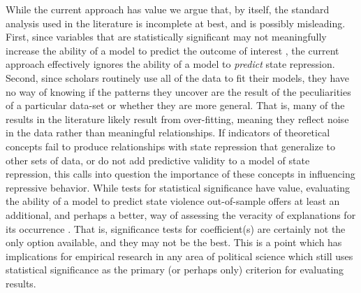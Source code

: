 \documentclass[12pt]{article}
\begin{document}
While the current approach has value we argue that, by itself, the standard analysis used in the literature is incomplete at best, and is possibly misleading. First, since variables that are statistically significant may not meaningfully increase the ability of a model to predict the outcome of interest \citep{Wardetal2010}, the current approach effectively ignores the ability of a model to {\em predict} state repression. Second, since scholars routinely use all of the data to fit their models, they have no way of knowing if the patterns they uncover are the result of the peculiarities of a particular data-set or whether they are more general. That is, many of the results in the literature likely result from over-fitting, meaning they reflect noise in the data rather than meaningful relationships. If indicators of theoretical concepts fail to produce relationships with state repression that generalize to other sets of data, or do not add predictive validity to a model of state repression, this calls into question the importance of these concepts in influencing repressive behavior. While tests for statistical significance have value, evaluating the ability of a model to predict state violence out-of-sample offers at least an additional, and perhaps a better, way of assessing the veracity of explanations for its occurrence \citep[See, e.g.][]{BeckKingZeng2000}. That is, significance tests for coefficient(s) are certainly not the only option available, and they may not be the best. This is a point which has implications for empirical research in any area of political science which still uses statistical significance as the primary (or perhaps only) criterion for evaluating results.
\end{document}
